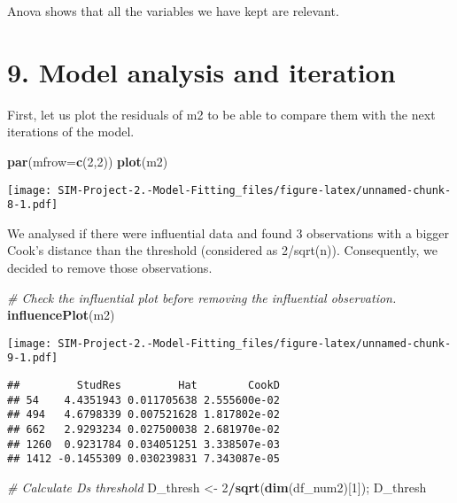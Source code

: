 \documentclass[
]{article}
\newenvironment{Shaded}{\begin{snugshade}}{\end{snugshade}}
\newcommand{\AttributeTok}[1]{\textcolor[rgb]{0.13,0.29,0.53}{#1}}
\newcommand{\CommentTok}[1]{\textcolor[rgb]{0.56,0.35,0.01}{\textit{#1}}}
\newcommand{\DecValTok}[1]{\textcolor[rgb]{0.00,0.00,0.81}{#1}}
\newcommand{\FunctionTok}[1]{\textcolor[rgb]{0.13,0.29,0.53}{\textbf{#1}}}
\newcommand{\NormalTok}[1]{#1}
\newcommand{\OtherTok}[1]{\textcolor[rgb]{0.56,0.35,0.01}{#1}}
\newcommand{\SpecialCharTok}[1]{\textcolor[rgb]{0.81,0.36,0.00}{\textbf{#1}}}
\begin{document}
Anova shows that all the variables we have kept are relevant.

\hypertarget{model-analysis-and-iteration}{%
\section{9. Model analysis and
iteration}\label{model-analysis-and-iteration}}

First, let us plot the residuals of m2 to be able to compare them with
the next iterations of the model.

\begin{Shaded}
\begin{Highlighting}[]
\FunctionTok{par}\NormalTok{(}\AttributeTok{mfrow=}\FunctionTok{c}\NormalTok{(}\DecValTok{2}\NormalTok{,}\DecValTok{2}\NormalTok{))}
\FunctionTok{plot}\NormalTok{(m2)}
\end{Highlighting}
\end{Shaded}

\texttt{[image: SIM-Project-2.-Model-Fitting\_files/figure-latex/unnamed-chunk-8-1.pdf]}

We analysed if there were influential data and found 3 observations with
a bigger Cook's distance than the threshold (considered as 2/sqrt(n)).
Consequently, we decided to remove those observations.

\begin{Shaded}
\begin{Highlighting}[]
\CommentTok{\# Check the influential plot before removing the influential observation.}
\FunctionTok{influencePlot}\NormalTok{(m2)}
\end{Highlighting}
\end{Shaded}

\texttt{[image: SIM-Project-2.-Model-Fitting\_files/figure-latex/unnamed-chunk-9-1.pdf]}

\begin{verbatim}
##         StudRes         Hat        CookD
## 54    4.4351943 0.011705638 2.555600e-02
## 494   4.6798339 0.007521628 1.817802e-02
## 662   2.9293234 0.027500038 2.681970e-02
## 1260  0.9231784 0.034051251 3.338507e-03
## 1412 -0.1455309 0.030239831 7.343087e-05
\end{verbatim}

\begin{Shaded}
\begin{Highlighting}[]
\CommentTok{\# Calculate D\textquotesingle{}s threshold}
\NormalTok{D\_thresh }\OtherTok{\textless{}{-}} \DecValTok{2}\SpecialCharTok{/}\FunctionTok{sqrt}\NormalTok{(}\FunctionTok{dim}\NormalTok{(df\_num2)[}\DecValTok{1}\NormalTok{]); D\_thresh}
\end{Highlighting}
\end{Shaded}
\end{document}
